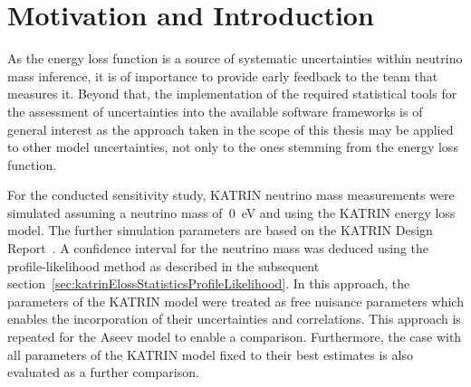 \section{Motivation and Introduction}
\label{sec:katrinElossConcept}
As the energy loss function is a source of systematic uncertainties within neutrino mass inference, it is of importance to provide early feedback to the team that measures it. Beyond that, the implementation of the required statistical tools for the assessment of uncertainties into the available software frameworks is of general interest as the approach taken in the scope of this thesis may be applied to other model uncertainties, not only to the ones stemming from the energy loss function.

For the conducted sensitivity study, KATRIN neutrino mass measurements were simulated assuming a neutrino mass of~\SI{0}{eV} and using the KATRIN energy loss model. The further simulation parameters are based on the KATRIN Design Report~\cite{Angrik:2005ep}. A confidence interval for the neutrino mass was deduced using the profile-likelihood method as described in the subsequent section~\ref{sec:katrinElossStatisticsProfileLikelihood}. In this approach, the parameters of the KATRIN model were treated as free nuisance parameters which enables the incorporation of their uncertainties and correlations. This approach is repeated for the Aseev model to enable a comparison. Furthermore, the case with all parameters of the KATRIN model fixed to their best estimates is also evaluated as a further comparison.

